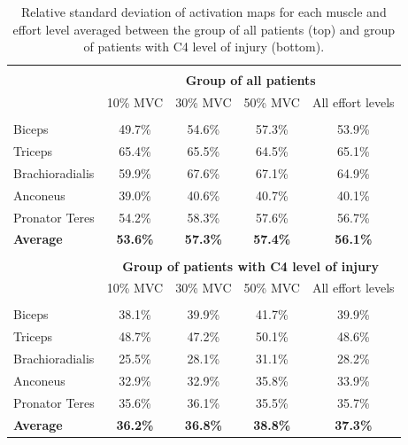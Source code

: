 \begin{table}[]
\centering
\caption{Relative standard deviation of activation maps for each muscle and effort level averaged between the group of all patients (top) and group of patients with C4 level of injury (bottom).}
\label{tb:2-1}
\begin{tabular}{lcccc}
 & & & &\\
                & \multicolumn{4}{c}{\large{\textbf{Group of all patients}}}                \\ 
                & \large{10\% MVC}                                  & \large{30\% MVC} & \large{50\% MVC} & \large{All effort levels} \\ \hline
                &                                           &          &          &                   \\
Biceps          & 49.7\%                                    & 54.6\%   & 57.3\%   & 53.9\%            \\
Triceps         & 65.4\%                                    & 65.5\%   & 64.5\%   & 65.1\%            \\
Brachioradialis & 59.9\%                                    & 67.6\%   & 67.1\%   & 64.9\%            \\
Anconeus        & 39.0\%                                    & 40.6\%   & 40.7\%   & 40.1\%            \\
Pronator Teres  & 54.2\%                                    & 58.3\%   & 57.6\%   & 56.7\%            \\
\textbf{Average}    & \textbf{53.6\%}  & \textbf{57.3\%}  & \textbf{57.4\%} & \textbf{56.1\%}            \\
                &                                           &          &          &                   \\
                & \multicolumn{4}{c}{\large{\textbf{Group of patients with C4 level of injury}}}                    \\
                & \large{10\% MVC}                                  & \large{30\% MVC} & \large{50\% MVC} & \large{All effort levels} \\ \hline
                &                                           &          &          &                   \\
Biceps          & 38.1\%                                    & 39.9\%   & 41.7\%   & 39.9\%            \\
Triceps         & 48.7\%                                    & 47.2\%   & 50.1\%   & 48.6\%            \\
Brachioradialis & 25.5\%                                    & 28.1\%   & 31.1\%   & 28.2\%            \\
Anconeus        & 32.9\%                                    & 32.9\%   & 35.8\%   & 33.9\%            \\
Pronator Teres  & 35.6\%                                    & 36.1\%   & 35.5\%   & 35.7\%            \\
\textbf{Average}     & \textbf{36.2\%}        & \textbf{36.8\%}  & \textbf{38.8\%} & \textbf{37.3\%}          
\end{tabular}
\end{table}


